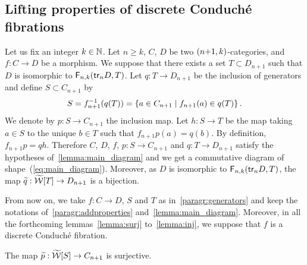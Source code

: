     
\subsection{Lifting properties of discrete Conduché fibrations}\label{subsec:lifting}
\begin{paragr}\label{paragr:generators}
 Let us fix an integer $k\in\mathbb N$.  Let $n\geq k$, $C$, $D$ be two $(n{+}1,k)$-categories, and $f:C\to D$ be a
 morphism. We suppose that there exists a set $T\subset D_{n+1}$ such
  that $D$ is isomorphic to $\mathsf{F}_{n,k}(\mathsf{tr}_{n}D,T)$.
Let $q:T\to D_{n+1}$ be the inclusion of
  generators and define $S\subset C_{n+1}$ by
  \[
 S=f_{n+1}^{-1}(q(T))=\left\{ a\in C_{n+1}\; | \; f_{n+1}(a)\in q(T)\right\}.
\]
We denote by $p:S\to C_{n+1}$ the inclusion map.
  Let $h:S\to T$ be the map taking $a\in S$ to the unique $b\in T$ such
  that $f_{n+1}p(a)=q(b)$. By definition, $f_{n+1}p=qh$. Therefore
  $C$, $D$, $f$, $p:S\to C_{n+1}$ and $q:T\to D_{n+1}$ satisfy the
  hypotheses of~\cref{lemma:main_diagram} and we get a commutative
  diagram of shape~(\ref{eq:main_diagram}). Moreover, as $D$ is
  isomorphic to $\mathsf{F}_{n,k}(\mathsf{tr}_{n}D,T)$,
  the map $\widetilde{q}:\widetilde{\mathcal{W}}[T]\to D_{n+1}$ is a
  bijection.
  \begin{paragr}\label{paragr:hypotheses}
    From now on, we take $f:C\to D$, $S$ and $T$ as
    in~\ref{paragr:generators} and keep the notations
    of~\ref{paragr:addproperties}
    and~\cref{lemma:main_diagram}. Moreover, in all the forthcoming
    lemmas~\ref{lemma:surj} to~\ref{lemma:inj}, we suppose that $f$ is a discrete Conduché fibration.
  \end{paragr}
\end{paragr}
\begin{lemma}\label{lemma:surj}
 The map $\widetilde{p}:\widetilde{\mathcal{W}}[S]\to
 C_{n+1}$ is surjective.
\end{lemma}
